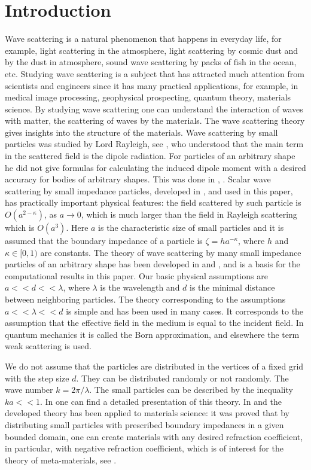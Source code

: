 \documentclass[12pt]{elsarticle}
\numberwithin{equation}{section}
\begin{document}
\section{Introduction} \label{sec1}
Wave scattering is a natural phenomenon that happens in everyday life, for example, light scattering in the atmosphere, light scattering by cosmic dust and by the dust in atmosphere, sound wave scattering by packs of fish in the ocean, etc.
Studying wave scattering is a subject that has attracted much attention from scientists and engineers since it has many practical applications, for example, in  medical image processing,  geophysical prospecting, quantum theory, materials science. By studying wave scattering one can understand the interaction of waves with matter,  the scattering of waves by the materials.
The wave scattering theory gives insights into the structure of the materials. Wave scattering by small particles was studied by Lord Rayleigh, see \cite{Ray}, who understood that the main term in the scattered field is the dipole radiation. For particles of an arbitrary shape he did not give formulas for calculating the induced dipole moment with a desired accuracy for bodies of arbitrary shapes. This was done in \cite{R57}, \cite{R476}. Scalar wave scattering by small impedance particles, developed in \cite{R635}, and used in this paper, has practically important physical features:
the field scattered by such particle is $O(a^{2-\kappa})$, as $a\to 0$, which is  much larger than the field in Rayleigh scattering which is $O(a^3)$. Here $a$ is the characteristic size of small particles and it is assumed that the boundary impedance of a particle is $\zeta=ha^{-\kappa}$, where $h$ and $\kappa\in [0,1)$ are constants. The theory of wave scattering by many small impedance particles of an arbitrary shape has been developed in \cite{R632} and \cite{R635}, and is a basis for the computational results in this paper. Our basic physical assumptions are $a<<d<<\lambda$, where
  $\lambda$ is the wavelength and   $d$ is  the minimal distance between neighboring particles. The theory corresponding to the assumptions $a<<\lambda<<d$   is simple and has been used in many cases. It corresponds to the assumption that the effective field in the medium
  is equal to the incident field. In quantum mechanics it is called the Born approximation, and elsewhere the term weak scattering is used.
 
  We do not assume
that the particles are distributed in the vertices of a fixed grid with the step size $d$. They can be distributed randomly or not randomly.
The wave number $k=2\pi/\lambda$. The small particles can be described by the inequality $ka<<1$.
In \cite{R635} one can find a detailed presentation of this theory.
In \cite{R632} and \cite{R635} the developed theory has been applied to materials science: it
was proved that by distributing  small particles with  prescribed boundary impedances in a given bounded domain, one can create materials with any desired refraction coefficient, in particular, with negative refraction coefficient, which is of interest for the theory of meta-materials, see \cite{EB2005}.
\end{document}
